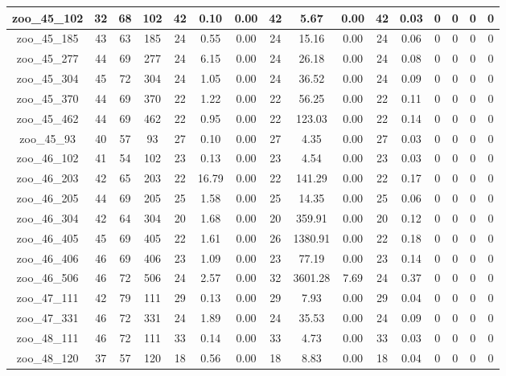 \begin{landscape}
\begin{longtable}{|c|c|c|c|c|c|c|c|c|c|c|c|c|c|c|c|}
zoo\_45\_102 & 32 & 68 & 102 & 42 & 0.10 & 0.00 & 42 & 5.67 & 0.00 & 42 & 0.03 & 0 & 0 & 0 & 0 \\ \hline 
zoo\_45\_185 & 43 & 63 & 185 & 24 & 0.55 & 0.00 & 24 & 15.16 & 0.00 & 24 & 0.06 & 0 & 0 & 0 & 0 \\ \hline 
zoo\_45\_277 & 44 & 69 & 277 & 24 & 6.15 & 0.00 & 24 & 26.18 & 0.00 & 24 & 0.08 & 0 & 0 & 0 & 0 \\ \hline 
zoo\_45\_304 & 45 & 72 & 304 & 24 & 1.05 & 0.00 & 24 & 36.52 & 0.00 & 24 & 0.09 & 0 & 0 & 0 & 0 \\ \hline 
zoo\_45\_370 & 44 & 69 & 370 & 22 & 1.22 & 0.00 & 22 & 56.25 & 0.00 & 22 & 0.11 & 0 & 0 & 0 & 0 \\ \hline 
zoo\_45\_462 & 44 & 69 & 462 & 22 & 0.95 & 0.00 & 22 & 123.03 & 0.00 & 22 & 0.14 & 0 & 0 & 0 & 0 \\ \hline 
zoo\_45\_93 & 40 & 57 & 93 & 27 & 0.10 & 0.00 & 27 & 4.35 & 0.00 & 27 & 0.03 & 0 & 0 & 0 & 0 \\ \hline 
zoo\_46\_102 & 41 & 54 & 102 & 23 & 0.13 & 0.00 & 23 & 4.54 & 0.00 & 23 & 0.03 & 0 & 0 & 0 & 0 \\ \hline 
zoo\_46\_203 & 42 & 65 & 203 & 22 & 16.79 & 0.00 & 22 & 141.29 & 0.00 & 22 & 0.17 & 0 & 0 & 0 & 0 \\ \hline 
zoo\_46\_205 & 44 & 69 & 205 & 25 & 1.58 & 0.00 & 25 & 14.35 & 0.00 & 25 & 0.06 & 0 & 0 & 0 & 0 \\ \hline 
zoo\_46\_304 & 42 & 64 & 304 & 20 & 1.68 & 0.00 & 20 & 359.91 & 0.00 & 20 & 0.12 & 0 & 0 & 0 & 0 \\ \hline 
zoo\_46\_405 & 45 & 69 & 405 & 22 & 1.61 & 0.00 & 26 & 1380.91 & 0.00 & 22 & 0.18 & 0 & 0 & 0 & 0 \\ \hline 
zoo\_46\_406 & 46 & 69 & 406 & 23 & 1.09 & 0.00 & 23 & 77.19 & 0.00 & 23 & 0.14 & 0 & 0 & 0 & 0 \\ \hline 
zoo\_46\_506 & 46 & 72 & 506 & 24 & 2.57 & 0.00 & 32 & 3601.28 & 7.69 & 24 & 0.37 & 0 & 0 & 0 & 0 \\ \hline 
zoo\_47\_111 & 42 & 79 & 111 & 29 & 0.13 & 0.00 & 29 & 7.93 & 0.00 & 29 & 0.04 & 0 & 0 & 0 & 0 \\ \hline 
zoo\_47\_331 & 46 & 72 & 331 & 24 & 1.89 & 0.00 & 24 & 35.53 & 0.00 & 24 & 0.09 & 0 & 0 & 0 & 0 \\ \hline 
zoo\_48\_111 & 46 & 72 & 111 & 33 & 0.14 & 0.00 & 33 & 4.73 & 0.00 & 33 & 0.03 & 0 & 0 & 0 & 0 \\ \hline 
zoo\_48\_120 & 37 & 57 & 120 & 18 & 0.56 & 0.00 & 18 & 8.83 & 0.00 & 18 & 0.04 & 0 & 0 & 0 & 0 \\ \hline 

\end{longtable}
\end{landscape}
